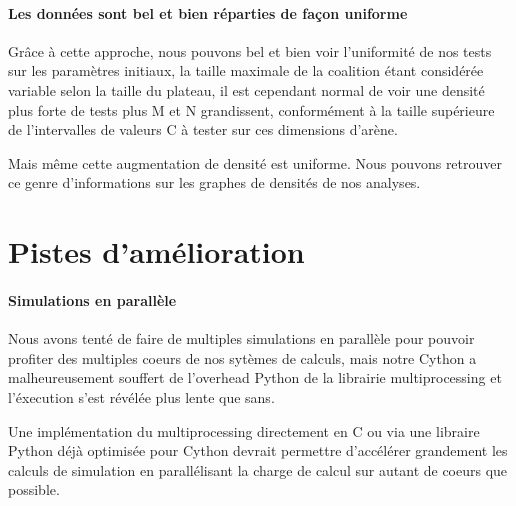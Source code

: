 		\paragraph{Les données sont bel et bien réparties de façon uniforme}
		Grâce à cette approche, nous pouvons bel et bien voir l'uniformité de nos tests sur les paramètres initiaux, la taille maximale de la coalition étant considérée variable selon la taille du plateau, il est cependant normal de voir une densité plus forte de tests plus M et N grandissent, conformément à la taille supérieure de l'intervalles de valeurs C à tester sur ces dimensions d'arène.
		
		Mais même cette augmentation de densité est uniforme.
		Nous pouvons retrouver ce genre d'informations sur les graphes de densités de nos analyses.
		

	\section{Pistes d'amélioration}
	
		\paragraph{Simulations en parallèle}
		Nous avons tenté de faire de multiples simulations en parallèle pour pouvoir profiter des multiples coeurs de nos sytèmes de calculs, mais notre Cython a malheureusement souffert de l'overhead Python de la librairie multiprocessing et l'éxecution s'est révélée plus lente que sans.
		
		Une implémentation du multiprocessing directement en C ou via une libraire Python déjà optimisée pour Cython devrait permettre d'accélérer grandement les calculs de simulation en parallélisant la charge de calcul sur autant de coeurs que possible.